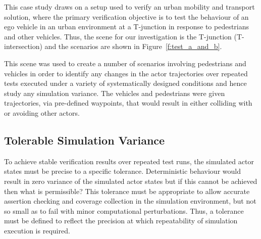 \documentclass[letterpaper, 10 pt, journal, twoside]{IEEEtran}
\begin{document}
This case study draws on a setup used to verify an urban mobility and transport solution, where the primary verification objective is to test the behaviour of an ego vehicle in an urban environment at a T-junction in response to pedestrians and other vehicles.
%
Thus, the scene for our investigation is the T-junction (T-intersection) and the scenarios are shown in Figure~\ref{f:test_a_and_b}.

This scene was used to create a number of scenarios involving pedestrians and vehicles in order to identify any changes in the actor trajectories over repeated tests executed under a variety of systematically designed conditions and hence study any simulation variance.
%
The vehicles and pedestrians were given trajectories, via pre-defined waypoints, that would result in either colliding with or avoiding other actors.





\subsection{Tolerable Simulation Variance}



To achieve stable verification results over repeated test runs, the simulated actor states must be precise to a specific tolerance.
%
Deterministic behaviour would result in zero variance of the simulated actor states but if this cannot be achieved then what is permissible?
%
%
This tolerance must be appropriate to allow accurate assertion checking and coverage collection in the simulation environment, but not so small as to fail with minor computational perturbations.
%
Thus, a tolerance must be defined to reflect the precision at which repeatability of simulation execution is required. 
\end{document}
